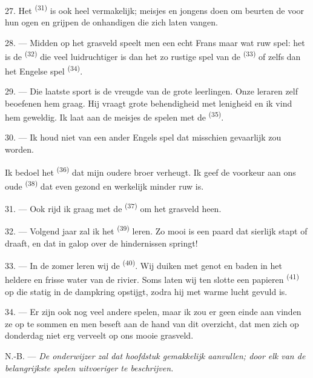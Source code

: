 \VUsaut{5.0mm}
\VUsaut{3.4mm}

27. Het  \textsuperscript{(31)} is ook heel vermakelijk; meisjes en
jongens doen om beurten de  voor hun ogen en grijpen de onhandigen die zich
laten vangen.

28. --- Midden op het grasveld speelt men een echt Frans maar wat ruw spel: het is de
 \textsuperscript{(32)} die veel luidruchtiger is dan het zo rustige spel van de
 \textsuperscript{(33)} of zelfs dan het Engelse spel 
\textsuperscript{(34)}.

29. --- Die laatste sport is de vreugde van de grote leerlingen. Onze leraren zelf beoefenen
hem graag. Hij vraagt grote behendigheid met lenigheid en ik vind hem geweldig. Ik laat aan de
meisjes de spelen met de  \textsuperscript{(35)}.

30. --- Ik houd niet van een ander Engels spel dat misschien gevaarlijk zou worden.

Ik bedoel het  \textsuperscript{(36)} dat mijn oudere broer verheugt. Ik geef
de voorkeur aan ons oude  \textsuperscript{(38)} dat even gezond en
werkelijk minder ruw is.

\VUsaut{4.6mm}
\VUsaut{3.0mm}

31. --- Ook rijd ik graag met de  \textsuperscript{(37)} om het grasveld heen.

32. --- Volgend jaar zal ik het  \textsuperscript{(39)} leren. Zo mooi is
een paard dat sierlijk stapt of draaft, en dat in galop over de hindernissen springt!

33. --- In de zomer leren wij de  \textsuperscript{(40)}. Wij duiken met
genot en baden in het heldere en frisse water van de rivier. Soms laten wij ten slotte een
papieren  \textsuperscript{(41)} op die statig in de dampkring opstijgt, zodra
hij met warme lucht gevuld is.

34. --- Er zijn ook nog veel andere spelen, maar ik zou er geen einde aan vinden ze op te
sommen en men beseft aan de hand van dit overzicht, dat men zich op donderdag niet erg
verveelt op ons mooie grasveld.

N.-B. --- \textit{De onderwijzer zal dat hoofdstuk gemakkelijk aanvullen; door elk van de
belangrijkste spelen uitvoeriger te beschrijven.}
\VUsaut{6.0mm}
\VUfilet{22mm}
